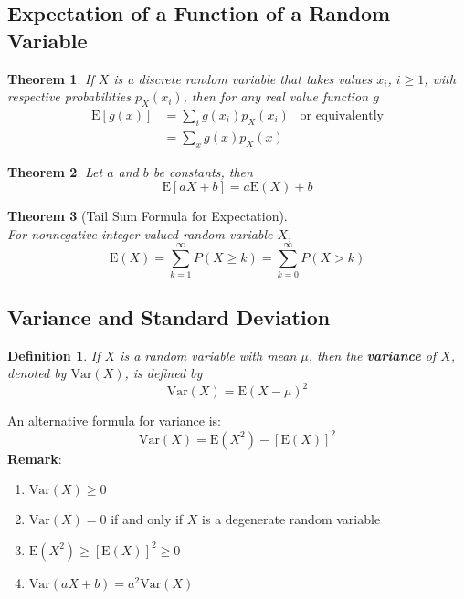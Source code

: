 \documentclass[12pt]{article}
\newcommand{\var}{\mathrm{Var}}
\newcommand{\expec}{\mathrm{E}}
\newtheorem{definition}{Definition}[section]
\newtheorem{theorem}{Theorem}[section]
\theoremstyle{definition}
\begin{document}
\subsection{Expectation of a Function of a Random Variable}
\begin{theorem}\normalfont If $X$ is a discrete random variable that takes values $x_i$, $i\geq 1$, with respective probabilities $p_X(x_i)$, then for any real value function $g$
\[
\begin{aligned}
\expec[g(x)]&=\sum_i g(x_i)p_X(x_i)\;\;\;\text{or equivalently}\\
&=\sum_x g(x)p_X(x)
\end{aligned}
\]
\end{theorem}
\begin{theorem}\normalfont Let $a$ and $b$ be constants, then
\[
\expec[aX+b]=a\expec(X)+b
\]
\end{theorem}
\begin{theorem}[Tail Sum Formula for Expectation]
\hfill\\\normalfont For \textit{nonnegative integer-valued} random variable $X$,
\[
\expec(X)=\sum_{k=1}^\infty P(X\geq k)=\sum_{k=0}^\infty P(X>k)
\]
\end{theorem}
\subsection{Variance and Standard Deviation}
\begin{definition}\normalfont If $X$ is a random variable with mean $\mu$, then the \textbf{variance} of $X$, denoted by $\var(X)$, is defined by
\[
\var(X)=\expec(X-\mu)^2
\]
\end{definition} 
An alternative formula for variance is:
\[
\var(X)=\expec(X^2)-[\expec(X)]^2
\]
\textbf{Remark}:
\begin{enumerate}
\item $\var(X)\geq 0$
\item $\var(X)=0$ if and only if $X$ is a degenerate random variable
\item $\expec(X^2)\geq [\expec(X)]^2\geq 0$
\item $\var(aX+b)=a^2\var(X)$
\end{enumerate}
\end{document}
